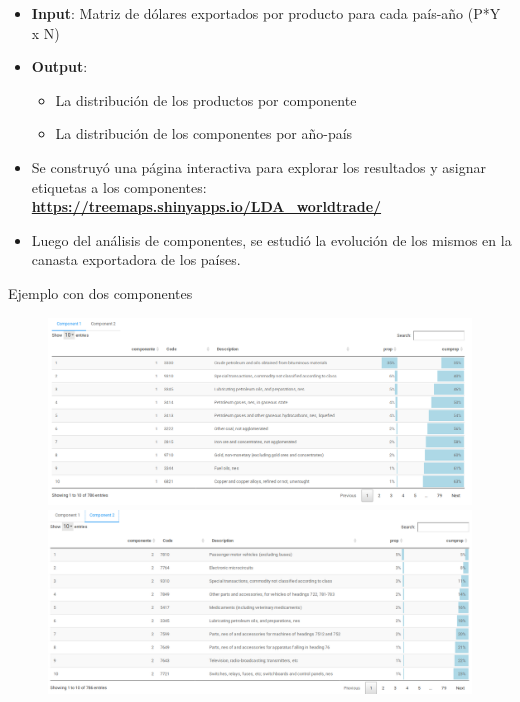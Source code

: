 \documentclass[compress]{beamer}
\begin{document}
\begin{frame}

\begin{itemize}[label=\faRebel]
\item \textbf{Input}: Matriz de dólares exportados por producto para cada país-año (P*Y x N)
\item \textbf{Output}:
\begin{itemize}
\item La distribución de los productos por componente
\item La distribución de los componentes por año-país
\end{itemize}

\item Se construyó una página interactiva para explorar los resultados y asignar etiquetas a los componentes: \textbf{\url{https://treemaps.shinyapps.io/LDA_worldtrade/}}
\item Luego del análisis de componentes, se estudió la evolución de los mismos en la canasta exportadora de los países.

\end{itemize}
\end{frame}


\begin{frame}
\tiny Ejemplo con dos componentes
\begin{figure}
\centering
\includegraphics[width=0.8\linewidth]{comp1k2}
\includegraphics[width=0.8\linewidth]{comp2k2}	
\end{figure}

\end{frame}
\end{document}
